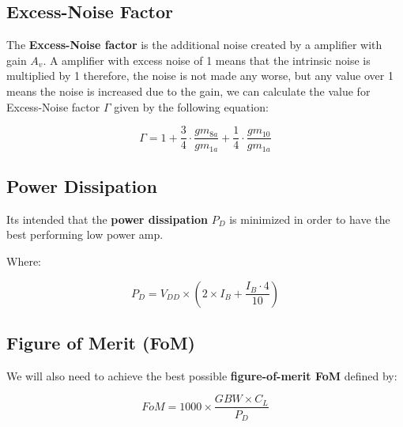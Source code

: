 \subsection{Excess-Noise Factor}
The \textbf{Excess-Noise factor} is the additional noise created by a amplifier with gain $A_v$. A amplifier with excess noise of 1 means that the intrinsic noise is multiplied by 1 therefore, the noise is not made any worse, but any value over 1 means the noise is increased due to the gain, we can calculate the value for Excess-Noise factor $\Gamma$ given by the following equation:

$$\Gamma = 1 + \frac{3}{4}\cdot \frac{gm_{8a}}{gm_{1a}} + \frac{1}{4}\cdot \frac{gm_{10}}{gm_{1a}}$$

\subsection{Power Dissipation}

Its intended that the \textbf{power dissipation} $P_D$ is minimized in order to have the best performing low power amp.

Where: 

$$P_D = V_{DD} \times \left(2 \times I_B + \dfrac{I_B\cdot 4}{10}\right) $$

\subsection{Figure of Merit (FoM)}
 We will also need to achieve the best possible \textbf{figure-of-merit FoM} defined by: 

$$FoM = 1000 \times \dfrac{GBW \times C_L}{P_D}$$
